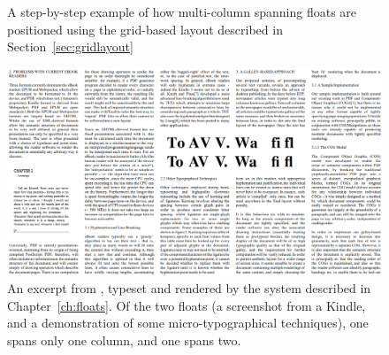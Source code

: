 \begin{figure}
    \hspace{0.04\textwidth}
    \caption[Step through of multi-column layout]{A step-by-step example of how multi-column spanning floats are positioned using the grid-based layout described in Section~\ref{sec:gridlayout}}
    \label{fig:floatlayout}
\end{figure}



\begin{figure}
    \includegraphics[angle=90,origin=c,width=\textwidth]{gfx/floatrendering}
    \caption[A sample rendering with multi-column floats]{An excerpt from \cite{Pinkney2011}, typeset and rendered by the system described in Chapter~\ref{ch:floats}. Of the two floats (a screenshot from a Kindle, and a demonstration of some micro-typographical techniques), one spans only one column, and one spans two. }
    \label{fig:screengrab}
\end{figure}


